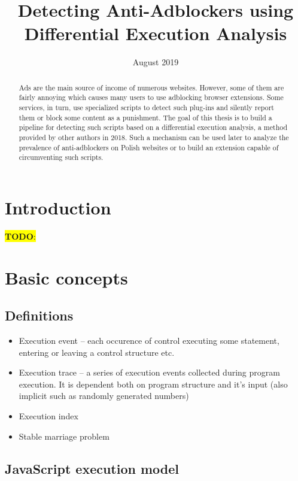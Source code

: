 \documentclass[en]{pracamgr}
\title{Detecting Anti-Adblockers using Differential Execution Analysis}
\date{August 2019}
\newcommand{\todo}[1]{\colorbox{yellow}{ \color{red} \textbf{TODO}: {#1}}}
\begin{document}
\maketitle

\begin{abstract}
Ads are the main source of income of numerous websites. 
However, some of them are fairly annoying which causes many users to use adblocking browser extensions. 
Some services, in turn, use specialized scripts to detect such plug-ins 
and silently report them or block some content as a punishment. 
The goal of this thesis is to build a pipeline for detecting such scripts based on a differential execution analysis, 
a method provided by other authors in 2018. 
Such a mechanism can be used later to analyze the prevalence of anti-adblockers 
on Polish websites or to build an extension capable of circumventing such scripts.

\end{abstract}

\tableofcontents

\chapter*{Introduction}

\todo{}

\chapter{Basic concepts}
\section{Definitions}

\begin{itemize}
  \item Execution event -- each occurence of control executing some statement, entering or leaving a control structure etc.
  \item Execution trace -- a series of execution events collected during program execution. 
           It is dependent both on program structure and it's input (also implicit such as randomly generated numbers)
  \item Execution index
  \item Stable marriage problem
\end{itemize}

\section{JavaScript execution model}
\end{document}

